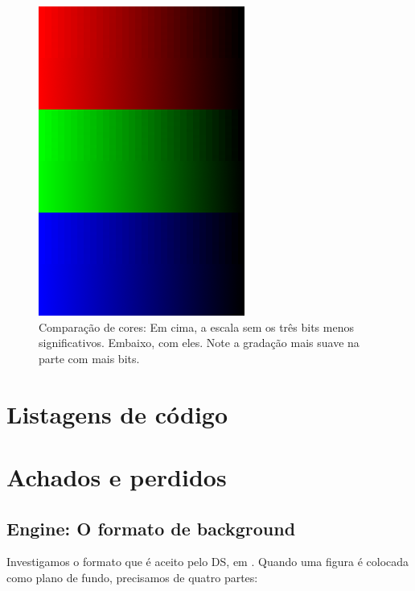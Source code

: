 \documentclass[brazil]{abnt}
\begin{document}
\begin{figure}[h]
\centering
\includegraphics{imgs/diferenca_cor.png}
\caption[Comparação de cores]{Comparação de cores: Em cima, a escala sem os três bits menos significativos. Embaixo, com eles. Note a gradação mais suave na parte com mais bits.}
\label{img:comparacao} 
\end{figure}

\chapter{Listagens de código}





\chapter{Achados e perdidos}

\section{Engine: O formato de background}

Investigamos o formato que é aceito pelo DS, em \cite{DSSpec}. Quando uma figura é colocada como plano de fundo, precisamos de quatro partes:
\end{document}

